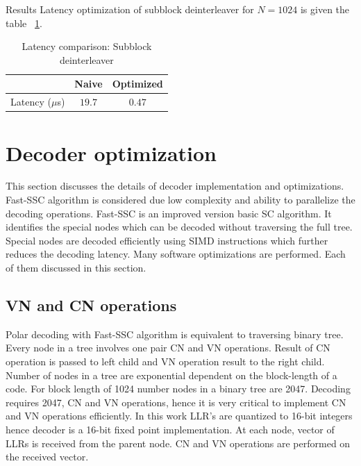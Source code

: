 Results Latency optimization of subblock deinterleaver for $N = 1024$ is given the table ~\ref{tab:subblockDeinterleaverLatency}.
\begin{table}[!h]
	\begin{center}
		\caption{Latency comparison: Subblock deinterleaver}
		\label{tab:subblockDeinterleaverLatency}
		\begin{tabular}{c|c|c} %
			\textbf{ } & Naive & Optimized \\
			\hline
			Latency ($\mu$s) & $19.7$ & $0.47$\\
		\end{tabular}
	\end{center}
\end{table}

\section{Decoder optimization}
This section discusses the details of decoder implementation and optimizations. Fast-SSC algorithm is considered due low complexity and ability to parallelize the decoding operations. Fast-SSC is an improved version basic SC algorithm. It identifies the special nodes which can be decoded without traversing the full tree. Special nodes are decoded efficiently using SIMD instructions which further reduces the decoding latency. Many software optimizations are performed. Each of them discussed in this section.

\subsection{VN and CN operations}
Polar decoding with Fast-SSC algorithm is equivalent to traversing binary tree. Every node in a tree involves one pair CN and VN operations. Result of CN operation is passed to left child and VN operation result to the right child. Number of nodes in a tree are exponential dependent on the block-length of a code. For block length of 1024 number nodes in a binary tree are 2047. Decoding requires 2047, CN and VN operations, hence it is very critical to implement CN and VN operations efficiently. In this work LLR's are quantized to 16-bit integers hence decoder is a 16-bit fixed point implementation. At each node, vector of LLRs is received from the parent node. CN and VN operations are performed on the received vector.

